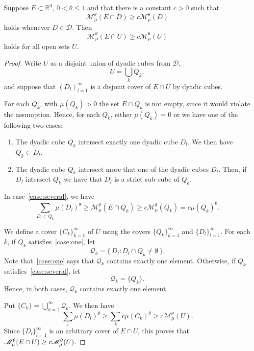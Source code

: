 \documentclass[AHL,Unicode,longabstracts]{cedram}
\begin{document}
\begin{lemm}\label{lem:open}
Suppose $E \subset \mathbb{R}^d$, $0 < \theta \leq 1$ and that there is a constant $c > 0$ such that
\[
\mathscr{M}_\mu^\theta (E \cap D) \geq c \mathscr{M}_\mu^\theta (D)
\]
holds whenever $D \in \mathscr{D}$. Then
\[
\mathscr{M}_\mu^\theta (E \cap U) \geq c \mathscr{M}_\mu^\theta (U)
\]
holds for all open sets $U$.
\end{lemm}

\begin{proof}
Write $U$ as a disjoint union of dyadic cubes from $\mathscr{D}$,
\[
U = \bigcup_k Q_k,
\]
and suppose that $(D_l)_{l=1}^\infty$ is a disjoint cover of $E \cap U$ by dyadic cubes.

For each $Q_k$, with $\mu (Q_k) > 0$ the set $E \cap Q_k$ is not empty, since it would violate the assumption. Hence, for each $Q_k$, either $\mu (Q_k) = 0$ or we have one of the following two cases:
\begin{enumerate}
\item \label{case:one}
The dyadic cube $Q_k$ intersect exactly one dyadic cube $D_l$. We then have $Q_k \subset D_l$.
\item \label{case:several}
The dyadic cube $Q_k$ intersect more that one of the dyadic cubes $D_l$. Then, if $D_l$ intersect $Q_k$ we have that $D_l$ is a strict sub-cube of $Q_k$.
\end{enumerate}
In case~\eqref{case:several}, we have
\[
\sum_{D_l \subset Q_k} \mu (D_l)^\theta \geq \mathscr{M}_\mu^\theta (E \cap Q_k) \geq c \mathscr{M}_\mu^\theta (Q_k) = c \mu (Q_k)^\theta.
\]

We define a cover $\{C_k\}_{k=1}^\infty$ of $U$ using the covers $\{Q_k\}_{k=1}^\infty$ and $\{D_l\}_{l=1}^\infty$. For each $k$, if $Q_k$ satisfies~\eqref{case:one}, let
\[
\mathscr{Q}_k = \{\, D_l : D_l \cap Q_k \neq \emptyset \,\}.
\]
Note that~\eqref{case:one} says that $\mathscr{Q}_k$ contains exactly one element. Otherwise, if $Q_k$ satisfies~\eqref{case:several}, let
\[
\mathscr{Q}_k = \{Q_k\}.
\]
Hence, in both cases, $\mathscr{Q}_k$ contains exactly one element.

Put $\{C_k\} = \bigcup_{k=1}^\infty \mathscr{Q}_k$. We then have
\[
\sum_l \mu (D_l)^\theta \geq \sum_k c \mu (C_k)^\theta \geq c \mathscr{M}_\mu^\theta (U).
\]
Since $\{D_l\}_{l=1}^\infty$ is an arbitrary cover of $E \cap U$, this proves that $\mathscr{M}_\mu^\theta (E \cap U) \geq\linebreak c \mathscr{M}_\mu^\theta (U)$.
\end{proof}
\end{document}
